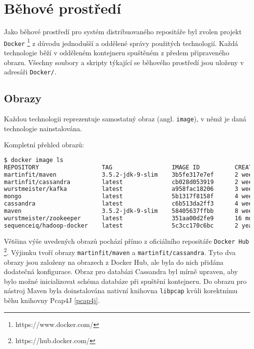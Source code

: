 \chapter{Běhové prostředí}
Jako běhové prostředí pro systém distribuovaného repositáře byl zvolen projekt \texttt{Docker} \footnote{https://www.docker.com/} z důvodu jednodušší a oddělené správy použitých technologií. Každá technologie běží v odděleném kontejneru spuštěném z předem připraveného obrazu. Všechny soubory a skripty týkající se běhového prostředí jsou uloženy v adresáři \texttt{Docker/}.

\section{Obrazy}
Každou technologii reprezentuje samostatný obraz (angl. \texttt{image}), v němž je daná technologie nainstalována.

\vspace{0.5cm}
\noindent Kompletní přehled obrazů:

\begin{lstlisting}[language=bash,basicstyle={\small\ttfamily}]
$ docker image ls
REPOSITORY                  TAG                 IMAGE ID          CREATED           SIZE
martinfit/maven             3.5.2-jdk-9-slim    3b5fe317e7ef      2 weeks ago       449MB
martinfit/cassandra         latest              cb028d053919      2 weeks ago       323MB
wurstmeister/kafka          latest              a958fac18206      3 weeks ago       330MB
mongo                       latest              5b1317f8158f      4 weeks ago       366MB
cassandra                   latest              c6b513da2ff3      4 weeks ago       323MB
maven                       3.5.2-jdk-9-slim    58405637ffbb      8 weeks ago       392MB
wurstmeister/zookeeper      latest              351aa00d2fe9      16 months ago     478MB
sequenceiq/hadoop-docker    latest              5c3cc170c6bc      2 years ago       1.77GB
\end{lstlisting}

\noindent Většina výše uvedených obrazů pochází přímo z oficiálního repositáře \texttt{Docker Hub} \footnote{https://hub.docker.com/}. Výjimku tvoří obrazy \texttt{martinfit/maven} a \texttt{martinfit/cassandra}. Tyto dva obrazy jsou založeny na obrazech z Docker Hub, ale byla do nich přidána dodatečná konfigurace. Obraz pro databázi Cassandra byl mírně upraven, aby bylo možné inicializovat schéma databáze při spuštění kontejneru. Do obrazu pro nástroj Maven byla doinstalována nativní knihovna \texttt{libpcap} kvůli korektnímu běhu knihovny Pcap4J \ref{pcap4j}.

